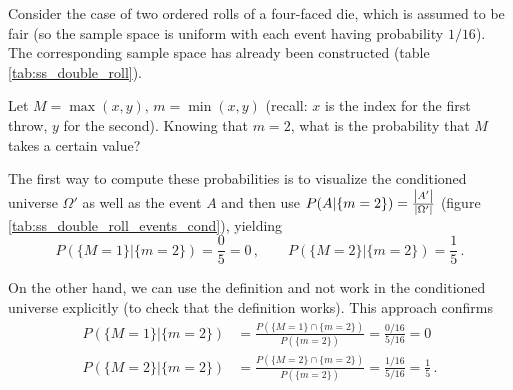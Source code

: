 \begin{ex}\label{ex:four_faced_die}
Consider the case of two ordered rolls of a four-faced die, which is assumed to be fair (so the sample space is uniform with each event having probability $1 / 16$). The corresponding sample space has already been constructed (table \ref{tab:ss_double_roll}).

Let $M = \max(x, y), \, m = \min(x, y)$ (recall: $x$ is the index for the first throw, $y$ for the second). Knowing that $m = 2$, what is the probability that $M$ takes a certain value?%

The first way to compute these probabilities is to visualize the conditioned universe $\Omega'$ as well as the event $A$ and then use $P(A | \{m = 2\}) = \frac{\abs{A'}}{\abs{\Omega'}}$ (figure \ref{tab:ss_double_roll_events_cond}), yielding
\begin{equation*}
P(\{M = 1\} | \{m = 2\}) = \frac{0}{5} = 0 \, , \qquad P(\{M = 2\} | \{m = 2\}) = \frac{1}{5} \, .
\end{equation*}


On the other hand, we can use the definition and not work in the conditioned universe explicitly (to check that the definition works). This approach confirms
\begin{align*}
P(\{M = 1\} | \{m = 2\}) &= \frac{P(\{M = 1\} \cap \{m = 2\})}{P(\{m = 2\})} = \frac{0 / 16}{5 / 16} = 0
\\
P(\{M = 2\} | \{m = 2\}) &= \frac{P(\{M = 2\} \cap \{m = 2\})}{P(\{m = 2\})} = \frac{1 / 16}{5 / 16} = \frac{1}{5} \, .
\end{align*}
\end{ex}




